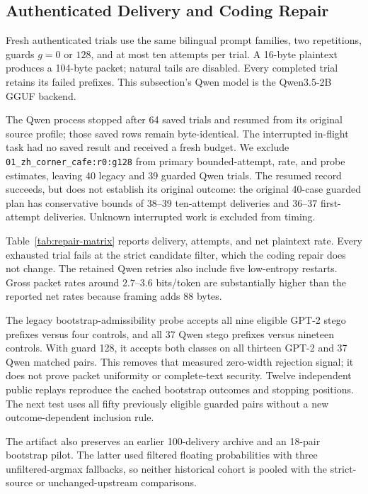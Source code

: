 \subsection{Authenticated Delivery and Coding Repair}

Fresh authenticated trials use the same bilingual prompt families, two
repetitions, guards $g=0$ or $128$, and at most ten attempts per trial.
A 16-byte plaintext produces a 104-byte packet; natural tails are disabled.
Every completed trial retains its failed prefixes. This subsection's Qwen
model is the Qwen3.5-2B GGUF backend.

The Qwen process stopped after 64 saved trials and resumed from its original
source profile; those saved rows remain byte-identical. The interrupted
in-flight task had no saved result and received a fresh budget. We exclude
\texttt{01\_zh\_corner\_cafe:r0:g128} from primary bounded-attempt, rate, and
probe estimates, leaving 40 legacy and 39 guarded Qwen trials. The resumed
record succeeds, but does not establish its original outcome: the original
40-case guarded plan has conservative bounds of 38--39 ten-attempt deliveries
and 36--37 first-attempt deliveries. Unknown interrupted work is excluded
from timing.



Table~\ref{tab:repair-matrix} reports delivery, attempts, and net plaintext
rate. Every exhausted trial fails at the strict candidate filter, which the
coding repair does not change. The retained Qwen retries also include five
low-entropy restarts. Gross packet rates around $2.7$--$3.6$ bits/token are
substantially higher than the reported net rates because framing adds 88 bytes.

The legacy bootstrap-admissibility probe accepts all nine eligible GPT-2
stego prefixes versus four controls, and all 37 Qwen stego prefixes versus
nineteen controls. With guard 128, it accepts both classes on all thirteen
GPT-2 and 37 Qwen matched pairs. This removes that measured zero-width
rejection signal; it does not prove packet uniformity or complete-text
security. Twelve independent public replays reproduce the cached bootstrap
outcomes and stopping positions. The next test uses all fifty previously
eligible guarded pairs without a new outcome-dependent inclusion rule.

The artifact also preserves an earlier 100-delivery archive and an 18-pair
bootstrap pilot. The latter used filtered floating probabilities with three
unfiltered-argmax fallbacks, so neither historical cohort is pooled with the
strict-source or unchanged-upstream comparisons.

